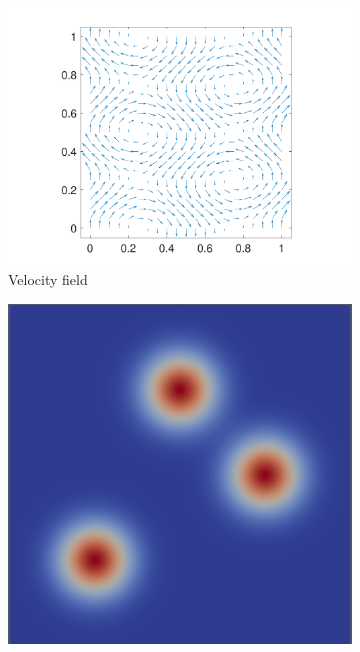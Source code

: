 \documentclass[review]{siamart}
\begin{document}
%
\begin{figure}[!htb]
  \centering
  \begin{subfigure}[b]{0.3\textwidth}
    \includegraphics[width=\textwidth]{./figures/velocity_field.pdf}
    \caption{Velocity field}\label{fig:v}
  \end{subfigure}
   \begin{subfigure}[b]{0.3\textwidth}
    \includegraphics[width=\textwidth]{./figures/solution.0000.png}

\end{subfigure}
\end{figure}
\end{document}
